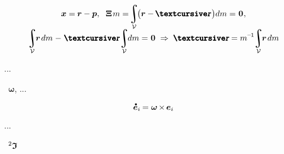 \begin{gather*}
\bm{x} = \hspace{-0.1ex} \locationvector - \positionofthepole
, \hspace{.6em}
\bm{\Xi} \hspace{.2ex} m = \hspace{-0.4ex} \integral_{\mathcal{V}} \hspace{-0.4ex} \bigl( \locationvector - \hspace{-0.1ex} \mathboldrcursive \hspace{.2ex} \bigr) dm = \hspace{.1ex} \bm{0}
\hspace{.1ex} ,
\\[-0.4em]
%
\integral_{\mathcal{V}} \hspace{-0.7ex} \locationvector \hspace{.25ex} dm \hspace{.1ex}
- \hspace{.2ex} \mathboldrcursive \hspace{-0.3ex} \integral_{\mathcal{V}} \hspace{-0.7ex} dm = \hspace{.1ex} \bm{0}
\hspace{.7ex} \Rightarrow \hspace{.7ex}
\mathboldrcursive = m^{\hspace{-0.1ex}\expminusone} \hspace{-0.5ex} \integral_{\mathcal{V}} \hspace{-0.7ex} \locationvector \hspace{.25ex} dm
\end{gather*}

...

  ~$\bm{\omega}$, ...

\[
\mathdotabove{\bm{e}}_i \hspace{-0.16ex}
= \bm{\omega} \hspace{-0.2ex} \times \hspace{-0.2ex} \bm{e}_i
\]

...

~${{\hspace{-0.1ex}^2}\bm{\mathfrak{I}}}$

